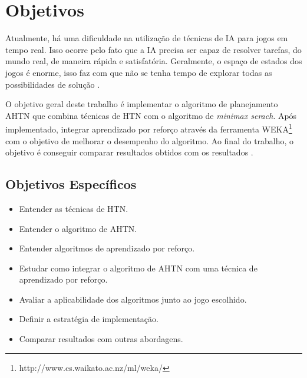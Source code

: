 \chapter{\label{chap:obje}Objetivos}

Atualmente, há uma dificuldade na utilização de técnicas de IA para jogos em tempo real. Isso ocorre pelo fato que a IA precisa ser capaz de resolver tarefas, do mundo real, de maneira rápida e satisfatória. Geralmente, o espaço de estados dos jogos é enorme, isso faz com que não se tenha tempo de explorar todas as possibilidades de solução \cite{millington2009artificial}.   

O objetivo geral deste trabalho é implementar o algoritmo de planejamento AHTN \cite{ontanon2015adversarial} que combina técnicas de HTN com o algoritmo de \textit{minimax serach}. Após implementado, integrar aprendizado por reforço através da ferramenta WEKA\footnote{http://www.cs.waikato.ac.nz/ml/weka/} com o objetivo de melhorar o desempenho do algoritmo. Ao final do trabalho, o objetivo é conseguir comparar resultados obtidos com os resultados \cite{ontanon2012experiments,hogg2010learning,ontanon2013survey}. 

\section{Objetivos Específicos}
\label{obj:esp}
\begin{itemize}
\item Entender as técnicas de HTN.
\item Entender o algoritmo de AHTN.
\item Entender algoritmos de aprendizado por reforço.
\item Estudar como integrar o algoritmo de AHTN com uma técnica de aprendizado por reforço. 
\item Avaliar a aplicabilidade dos algoritmos junto ao jogo escolhido.
\item Definir a estratégia de implementação.
\item Comparar resultados com outras abordagens.
\end{itemize}

